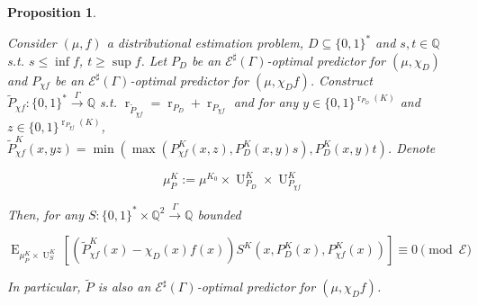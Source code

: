 \documentclass{article}
\numberwithin{equation}{section}
\theoremstyle{definition}
\theoremstyle{plain}
\newtheorem{proposition}{Proposition}[section]
\newcommand{\Bool}{\{0,1\}}
\newcommand{\Words}{{\Bool^*}}
\DeclareMathOperator{\E}{E}
\DeclareMathOperator{\R}{r}
\DeclareMathOperator{\Un}{U}
\newcommand{\Rats}{\mathbb{Q}}
\newcommand{\Fall}{\mathcal{E}}
\newcommand{\ESG}{\Fall^\sharp(\Gamma)}
\newcommand{\BoolR}[1]{\Bool^{\R_{#1}(K)}}
\newcommand{\Scheme}{\xrightarrow{\Gamma}}
\begin{document}
\begin{samepage}
\begin{proposition}
\label{prp:thm__cond__lemma}

Consider $(\mu, f)$ a distributional estimation problem, ${D \subseteq \Words}$ and $s, t \in \Rats$ s.t. ${s \leq \inf f}$, $t \geq \sup f$. Let $P_D$ be an $\ESG$-optimal predictor for $(\mu, \chi_D)$ and $P_{\chi f}$ be an $\ESG$-optimal predictor for $(\mu, \chi_D f)$. Construct $\tilde{P}_{\chi f}: \Words \Scheme \Rats$ s.t. $\R_{\tilde{P}_{\chi f}} = \R_{P_D} + \R_{P_{\chi f}}$ and for any ${y \in \BoolR{P_D}}$ and $z \in \BoolR{P_{\chi f}}$, ${\tilde{P}_{\chi f}^K(x,yz)=\min(\max(P_{\chi f}^K(x,z),P_D^K(x,y) s),P_D^K(x,y) t)}$. Denote 

\[\mu_P^K:=\mu^{K_0} \times \Un_{P_D}^K \times \Un_{P_{\chi f}}^K\] 

Then, for any $S: \Words \times \Rats^2 \Scheme \Rats$ bounded

\begin{equation}
\E_{\mu_P^K \times \Un_S^K}[(\tilde{P}_{\chi f}^K(x)-\chi_D(x)f(x))S^K(x,P_D^K(x),P_{\chi f}^K(x))]  \equiv 0 \pmod \Fall
\end{equation}

In particular, $\tilde{P}$ is also an $\ESG$-optimal predictor for $(\mu, \chi_D f)$.

\end{proposition}
\end{samepage}
\end{document}
